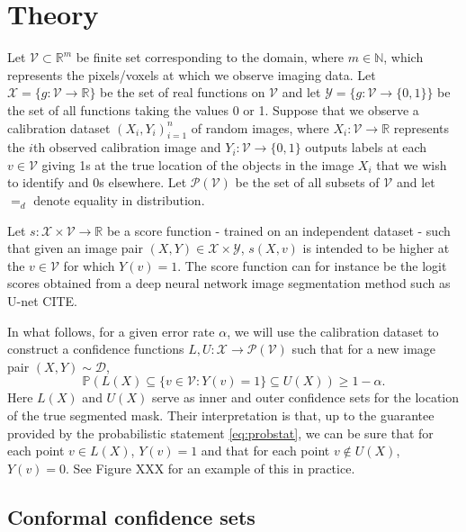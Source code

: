 \section{Theory}
Let $\mathcal{V} \subset \mathbb{R}^m$ be finite set corresponding to the domain, where $m \in \mathbb{N}$, which represents the pixels/voxels at which we observe imaging data. Let $\mathcal{X} = \lbrace g: \mathcal{V} \rightarrow \mathbb{R}\rbrace$ be the set of real functions on $\mathcal{V}$ and let $\mathcal{Y} = \lbrace g: \mathcal{V} \rightarrow \lbrace 0,1 \rbrace \rbrace$ be the set of all functions taking the values 0 or 1. Suppose that we observe a calibration dataset $(X_i, Y_i)_{i = 1}^n$ of random images, where $X_i: \mathcal{V} \rightarrow \mathbb{R}$ represents the $i$th observed calibration image and $Y_i:\mathcal{V} \rightarrow \lbrace 0, 1\rbrace$ outputs labels at each $v \in \mathcal{V}$ giving 1s at the true location of the objects in the image $X_i$ that we wish to identify and 0s elsewhere. Let $\mathcal{P}(\mathcal{V})$ be the set of all subsets of $\mathcal{V}$ and let $=_d$ denote equality in distribution.

Let $s:\mathcal{X} \times \mathcal{V} \rightarrow \mathbb{R}$ be a score function - trained on an independent dataset - such that given an image pair $(X,Y) \in \mathcal{X}\times \mathcal{Y}$, $s(X, v)$ is intended to be higher at the $v \in \mathcal{V}$ for which $Y(v) = 1$. The score function can for instance be the logit scores obtained from a deep neural network image segmentation method such as U-net CITE.

In what follows, for a given error rate $\alpha$, we will use the calibration dataset to construct a confidence functions $L,U: \mathcal{X}  \rightarrow \mathcal{P}(\mathcal{V})$ such that for a new image pair $(X,Y) \sim \mathcal{D}$,
\begin{equation}\label{eq:probstat}
	\mathbb{P}\left( L(X) \subseteq \lbrace v\in \mathcal{V}: Y(v) = 1 \rbrace \subseteq U(X) \right) \geq 1 - \alpha.
\end{equation}
Here $L(X)$ and $U(X)$ serve as inner and outer confidence sets for the location of the true segmented mask. Their interpretation is that, up to the guarantee provided by the probabilistic statement \eqref{eq:probstat}, we can be sure that for each point $v\in L(X)$, $Y(v) = 1$ and that for each point $v \not\in U(X)$, $Y(v) = 0$. See Figure XXX for an example of this in practice. 
\subsection{Conformal confidence sets}
